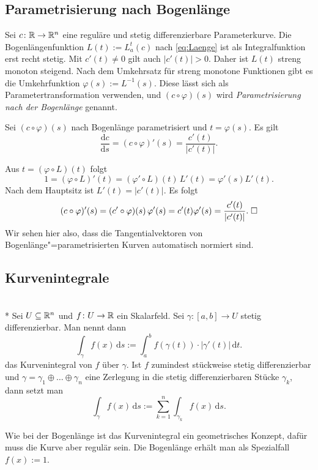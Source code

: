 \subsection{Parametrisierung nach Bogenlänge}

Sei $c\colon\mathbb R\to\mathbb R^n$ eine reguläre und stetig differenzierbare
Parameterkurve. Die Bogenlängenfunktion $L(t):=L_a^t(c)$ nach
\eqref{eq:Laenge} ist als Integralfunktion erst recht stetig.
Mit $c'(t)\ne 0$ gilt auch $|c'(t)|>0$. Daher ist $L(t)$ streng monoton
steigend. Nach dem Umkehrsatz für streng monotone Funktionen gibt es
die Umkehrfunktion $\varphi(s):=L^{-1}(s)$. Diese lässt sich als
Parametertransformation verwenden, und $(c\circ\varphi)(s)$ wird
\emph{Parametrisierung nach der Bogenlänge} genannt.

\begin{corollary}
Sei $(c\circ\varphi)(s)$ nach Bogenlänge parametrisiert
und $t=\varphi(s)$. Es gilt
\begin{equation}
\frac{\mathrm dc}{\mathrm ds} =
(c\circ\varphi)'(s) = \frac{c'(t)}{|c'(t)|}.
\end{equation}
\end{corollary}
\noindent{}
Aus $t=(\varphi\circ L)(t)$ folgt
\begin{equation}
1 = (\varphi\circ L)'(t) = (\varphi'\circ L)(t)\,L'(t) = \varphi'(s)L'(t).
\end{equation}
Nach dem Hauptsitz ist $L'(t)=|c'(t)|$. Es folgt
\begin{equation}
(c\circ\varphi)'(s) = (c'\circ\varphi)(s)\,\varphi'(s) = c'(t)\varphi'(s)
= \frac{c'(t)}{|c'(t)|}.\;\Box
\end{equation}
Wir sehen hier also, dass die Tangentialvektoren von
Bogenlänge"=parametrisierten Kurven automatisch normiert sind.

\subsection{Kurvenintegrale}
\begin{definition}\mbox{}\\*
Sei $U\subseteq\mathbb R^n$ und $f\colon U\to\mathbb R$ ein Skalarfeld.
Sei $\gamma\colon [a,b]\to U$ stetig differenzierbar. Man nennt dann%
\[\int_\gamma f(x)\,\mathrm ds := \int_a^b f(\gamma(t))\cdot |\gamma'(t)|\,\mathrm dt.\]
das Kurvenintegral von $f$ über $\gamma$.
Ist $f$ zumindest stückweise stetig differenzierbar und
$\gamma = \gamma_1\oplus\ldots\oplus\gamma_n$ eine Zerlegung
in die stetig differenzierbaren Stücke $\gamma_k$, dann setzt man%
\[\int_\gamma f(x)\,\mathrm ds := \sum_{k=1}^n \int_{\gamma_k} f(x)\,\mathrm ds.\]
\end{definition}
Wie bei der Bogenlänge ist das Kurvenintegral ein geometrisches
Konzept, dafür muss die Kurve aber regulär sein. Die Bogenlänge
erhält man als Spezialfall $f(x):=1$.

